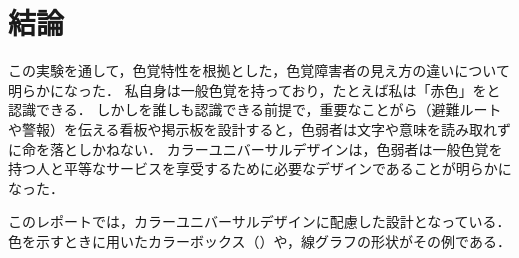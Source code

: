 \section{結論}
この実験を通して，色覚特性を根拠とした，色覚障害者の見え方の違いについて明らかになった．
私自身は一般色覚を持っており，たとえば私は「赤色」をと認識できる．
しかしを誰しも認識できる前提で，重要なことがら（避難ルートや警報）を伝える看板や掲示板を設計すると，色弱者は文字や意味を読み取れずに命を落としかねない．
カラーユニバーサルデザインは，色弱者は一般色覚を持つ人と平等なサービスを享受するために必要なデザインであることが明らかになった．\par
このレポートでは，カラーユニバーサルデザインに配慮した設計となっている．色を示すときに用いたカラーボックス（）や，線グラフの形状がその例である．
